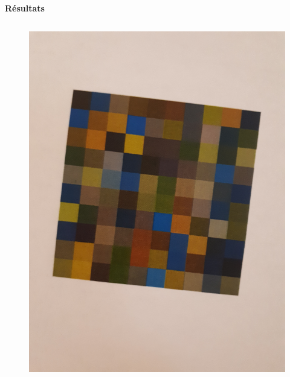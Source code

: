 \documentclass{beamer}
\begin{document}
\begin{frame}[t]
\begin{columns}[t]
\begin{column}{.5\linewidth}
                \begin{block}{\centering \textbf{Résultats}}
                    \begin{columns}[t]
                        \begin{column}{.2\linewidth}
                            \begin{figure}[t]
                                \includegraphics[width=\linewidth]{rsc/van_gogh_picture_a_10.png}\\
                            \end{figure}
                        \end{column}


\end{columns}
\end{block}
\end{column}
\end{columns}
\end{frame}
\end{document}
